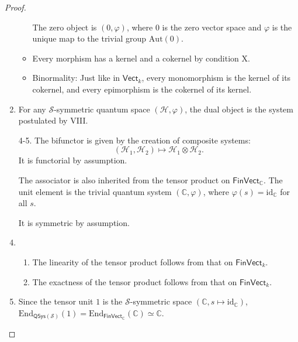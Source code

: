 \documentclass[a4paper,10pt]{scrreprt}
\newcommand{\C}{\mathbb{C}}
\newcommand{\End}{\mathrm{End}}
\newcommand{\Aut}{\mathrm{Aut}}
\theoremstyle{definition}
\theoremstyle{plain}
\theoremstyle{remark}
\begin{document}
\begin{proof}
\begin{enumerate}
\begin{itemize}
          The zero object is $(0, \varphi)$, where $0$ is the zero vector space and $\varphi$ is the unique map to the trivial group $\Aut(0)$.

        \item Every morphism has a kernel and a cokernel by condition X.

        \item Binormality: Just like in $\mathsf{Vect}_{k}$, every monomorphism is the kernel of its cokernel, and every epimorphism is the cokernel of its kernel.
      \end{itemize}

    \item For any $\mathcal{S}$-symmetric quantum space $(\mathscr{H}, \varphi)$, the dual object is the system postulated by VIII.

    \item[4-5.] The bifunctor is given by the creation of composite systems:
      \begin{equation*}
        (\mathscr{H}_{1}, \mathscr{H}_{2}) \mapsto \mathscr{H}_{1} \otimes \mathscr{H}_{2}.
      \end{equation*}
      It is functorial by assumption.

      The associator is also inherited from the tensor product on $\mathsf{FinVect}_{\C}$. The unit element is the trivial quantum system $(\C, \varphi)$, where $\varphi(s) = \mathrm{id}_{\C}$ for all $s$.

      It is symmetric by assumption.

      \setcounter{enumi}{5}
    \item 
      \begin{enumerate}
        \item The linearity of the tensor product follows from that on $\mathsf{FinVect}_{k}$.

        \item The exactness of the tensor product follows from that on $\mathsf{FinVect}_{k}$.
      \end{enumerate}

    \item Since the tensor unit $1$ is the $\mathcal{S}$-symmetric space $(\C, s \mapsto \mathrm{id}_{\C})$, $\End_{\mathsf{QSys}(\mathcal{S})}(1) = \End_{\mathsf{FinVect}_{\C}}(\C) \simeq \C$.
  \end{enumerate}
\end{proof}
\end{document}

